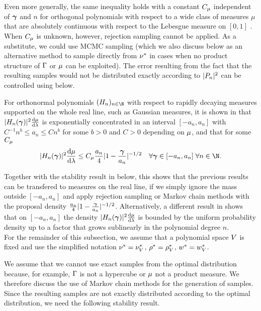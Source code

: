Even more generally, the same inequality holds with a constant $C_{\mu}$ independent of $\bm{\gamma}$ and $n$ for orthogonal polynomials with respect to a wide class of measures $\mu$ that are absolutely continuous with respect to the Lebesgue measure on $[0,1]$ \cite[Theorem 12.1.4]{MR0372517}.
When $C_{\mu}$ is unknown, however, rejection sampling cannot be applied. As a substitute, we could use MCMC sampling (which we also discuss below as an alternative method to sample directly from $\nu^{*}$ in cases when no product structure of $\Gamma$ or $\mu$ can be exploited). The error resulting from the fact that the resulting samples would not be distributed exactly according to $|P_n|^2$ can be controlled using  below.

For orthonormal polynomials $(\her_n)_{n\in\N}$ with respect to rapidly decaying measures supported on the whole real line, such as Gaussian measures, it is shown in  \cite{levin1992christoffel} that $|H_n(\bm{\gamma})|^2\frac{\text{d}\mu}{\text{d}\lambda}$ is exponentially concentrated in an interval $[-a_n,a_n]$ with $C^{-1}n^{b}\leq a_n\leq Cn^b$ for some $b>0$ and $C>0$ depending on $\mu$, and  that for some $C_{\mu}$
\begin{equation*}
|\her_n(\psmi)|^2\frac{\text{d}\measure}{\text{d}\lambda}\leq C_{\measure}\frac{a_n}{4}|1-\frac{\psmi}{a_n}|^{-1/2}\quad\forall \psmi\in[-a_n,a_n]\;\forall n\in\N.
\end{equation*}

 Together with the stability result in  below, this shows that the previous results can be transfered to measures on the real line, if we simply ignore the mass outside $[-a_n,a_n]$ and apply rejection sampling or Markov chain methods with the proposal density $\frac{a_n}{4}|1-\frac{\bm{\gamma}}{a_n}|^{-1/2}$.
 Alternatively, a different result in \cite{levin1992christoffel} shows that on $[-a_n,a_n]$ the density $|H_n(\bm{\gamma})|^2\frac{\text{d}\mu}{\text{d}\lambda}$ is bounded by the uniform probability density up to a factor that grows sublinearly in the polynomial degree $n$.
 \\

For the remainder of this subsection, we assume that a polynomial space $V$ is fixed and use the simplified notation  $\nu^{*}=\nu^{*}_{V}$, $\rho^{*}=\rho^{*}_{V}$,  $w^{*}=w^{*}_{V}$.

We assume that we cannot use exact samples from the optimal distribution because, for example, $\Gamma$ is not a hypercube or $\mu$ not a product measure. We therefore discuss the use of Markov chain methods for the generation of samples. Since the resulting samples are not exactly distributed according to the optimal distribution, we need the following stability result.

